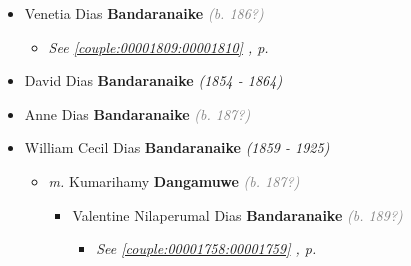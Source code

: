 \documentclass[10pt, openany]{book}
\begin{document}
\begin{itemize}
{\begin{itemize}
{\begin{itemize}
{\begin{itemize}
{\begin{itemize}
{\begin{itemize}
{\begin{itemize}
{\begin{itemize}
{\begin{itemize}
\end{itemize}
   }
\end{itemize}}
\end{itemize}
  }
\end{itemize}}
\end{itemize}
  }
\item{Conrad Peter \textbf{Pieris} \textcolor{gray}{\textit{(b. 190?)}}
  }
\item{Ruth \textbf{Pieris} \textcolor{gray}{\textit{(b. 190?)}}
 }
\item{Arthur William \textbf{Pieris} \textcolor{gray}{\textit{(b. 190?)}}
  }
\item{Soloman Franciscus \textbf{Pieris} \textcolor{gray}{\textit{(b. 191?)}}
  }
\end{itemize}}
\end{itemize}
  }
\item{Venetia Dias \textbf{Bandaranaike} \textcolor{gray}{\textit{(b. 186?)}}
\begin{itemize}
\item{\textcolor{slteal}{\textit{See  \autoref{couple:00001809:00001810} \textit{, p. \pageref{couple:00001809:00001810} }}}}
\end{itemize}
  }
\item{David Dias \textbf{Bandaranaike} \textcolor{slorange}{\textit{(1854 - 1864)}}
  }
\item{Anne Dias \textbf{Bandaranaike} \textcolor{gray}{\textit{(b. 187?)}}
  }
\item{William Cecil Dias \textbf{Bandaranaike} \textcolor{slorange}{\textit{(1859  - 1925)}}
\begin{itemize}
\item{\textit{m.} Kumarihamy \textbf{Dangamuwe} \textcolor{gray}{\textit{(b. 187?)}}   \label{couple:00001755:00001757} \begin{itemize}
\item{Valentine Nilaperumal Dias \textbf{Bandaranaike} \textcolor{gray}{\textit{(b. 189?)}}
\begin{itemize}
\item{\textcolor{slteal}{\textit{See  \autoref{couple:00001758:00001759} \textit{, p. \pageref{couple:00001758:00001759} }}}}

\end{itemize}}
\end{itemize}}
\end{itemize}}
\end{itemize}}
\end{itemize}
\end{document}

